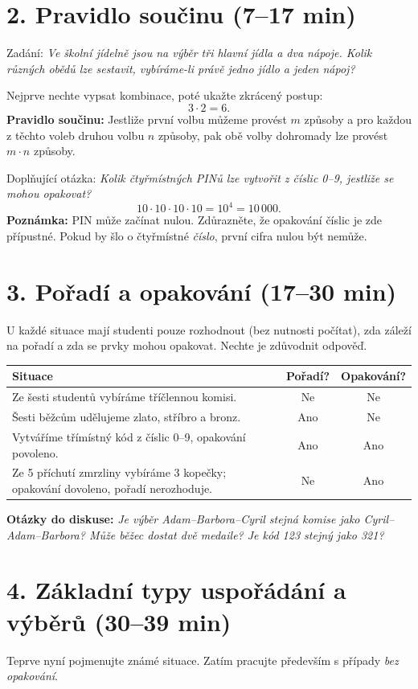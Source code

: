 \documentclass[10pt,a4paper]{article}
\newcommand{\cas}[1]{\textcolor{accent}{\bfseries #1}}
\newcommand{\otazka}[1]{\emph{#1}}
\begin{document}
\section*{2. Pravidlo součinu \texorpdfstring{\cas{(7--17 min)}}{(7--17 min)}}
Zadání: \otazka{Ve školní jídelně jsou na výběr tři hlavní jídla a dva nápoje. Kolik různých obědů lze sestavit, vybíráme-li právě jedno jídlo a jeden nápoj?}

Nejprve nechte vypsat kombinace, poté ukažte zkrácený postup:
\[
3\cdot 2=6.
\]
\textbf{Pravidlo součinu:} Jestliže první volbu můžeme provést \(m\) způsoby a pro každou z těchto voleb druhou volbu \(n\) způsoby, pak obě volby dohromady lze provést \(m\cdot n\) způsoby.

Doplňující otázka: \otazka{Kolik čtyřmístných PINů lze vytvořit z číslic 0--9, jestliže se mohou opakovat?}
\[
10\cdot10\cdot10\cdot10=10^4=10\,000.
\]
\textbf{Poznámka:} PIN může začínat nulou. Zdůrazněte, že opakování číslic je zde přípustné. Pokud by šlo o čtyřmístné \emph{číslo}, první cifra nulou být nemůže.

\section*{3. Pořadí a opakování \texorpdfstring{\cas{(17--30 min)}}{(17--30 min)}}
U každé situace mají studenti pouze rozhodnout (bez nutnosti počítat), zda záleží na pořadí a zda se prvky mohou opakovat. Nechte je zdůvodnit odpověď.

\begin{tabularx}{\textwidth}{@{}Xcc@{}}\toprule
\textbf{Situace} & \textbf{Pořadí?} & \textbf{Opakování?} \\\midrule
Ze šesti studentů vybíráme tříčlennou komisi. & Ne & Ne \\
Šesti běžcům udělujeme zlato, stříbro a bronz. & Ano & Ne \\
Vytváříme třímístný kód z číslic 0--9, opakování povoleno. & Ano & Ano \\
Ze 5 příchutí zmrzliny vybíráme 3 kopečky; opakování dovoleno, pořadí nerozhoduje. & Ne & Ano \\
\bottomrule\end{tabularx}

\textbf{Otázky do diskuse:} \otazka{Je výběr Adam--Barbora--Cyril stejná komise jako Cyril--Adam--Barbora? Může běžec dostat dvě medaile? Je kód 123 stejný jako 321?}

\section*{4. Základní typy uspořádání a výběrů \texorpdfstring{\cas{(30--39 min)}}{(30--39 min)}}
Teprve nyní pojmenujte známé situace. Zatím pracujte především s případy \emph{bez opakování}.
\end{document}

